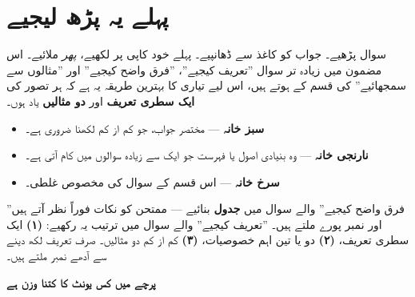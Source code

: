 \clearpage

\section*{پہلے یہ پڑھ لیجیے}

سوال پڑھیے۔ جواب کو کاغذ سے ڈھانپیے۔ پہلے خود کاپی پر لکھیے، \emph{پھر} ملائیے۔
اس مضمون میں زیادہ تر سوال ''تعریف کیجیے''، ''فرق واضح کیجیے'' اور ''مثالوں سے
سمجھائیے'' کی قسم کے ہوتے ہیں، اس لیے تیاری کا بہترین طریقہ یہ ہے کہ ہر تصور کی
\textbf{ایک سطری تعریف} اور \textbf{دو مثالیں} یاد ہوں۔

\medskip
\begin{itemize}\setlength{\itemsep}{2pt}
  \item \textbf{سبز خانہ} --- مختصر جواب، جو کم از کم لکھنا ضروری ہے۔
  \item \textbf{نارنجی خانہ} --- وہ بنیادی اصول یا فہرست جو ایک سے زیادہ سوالوں
        میں کام آتی ہے۔
  \item \textbf{سرخ خانہ} --- اس قسم کے سوال کی مخصوص غلطی۔
\end{itemize}

\begin{nukta}
''فرق واضح کیجیے'' والے سوال میں \textbf{جدول} بنائیے --- ممتحن کو نکات فوراً نظر
آتے ہیں اور نمبر پورے ملتے ہیں۔ ''تعریف کیجیے'' والے سوال میں ترتیب یہ رکھیے:
\textbf{(۱)} ایک سطری تعریف، \textbf{(۲)} دو یا تین اہم خصوصیات،
\textbf{(۳)} کم از کم دو مثالیں۔ صرف تعریف لکھ دینے سے آدھے نمبر ملتے ہیں۔
\end{nukta}

\medskip
\noindent
\textbf{\color{bmblue}پرچے میں کس یونٹ کا کتنا وزن ہے}

